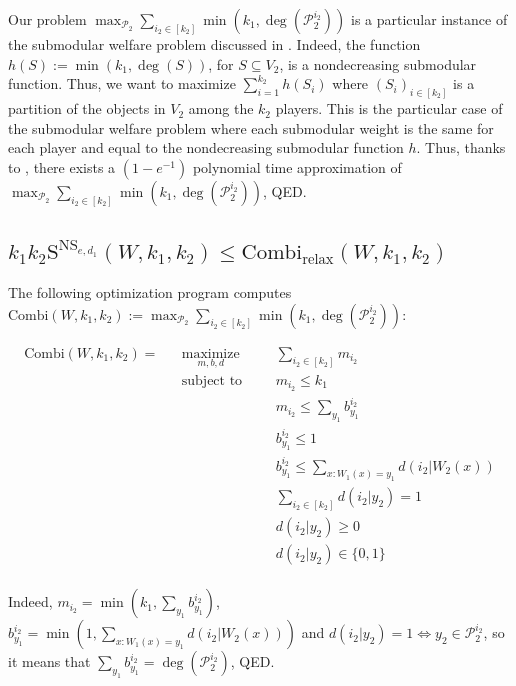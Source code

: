 \documentclass[11pt]{article}
\theoremstyle{definition}
\theoremstyle{remark}
\DeclareMathOperator{\maxi}{\text{maximize}}
\DeclareMathOperator{\st}{\text{subject to}}
\begin{document}
Our problem $\max_{\mathcal{P}_2}\sum_{i_2 \in [k_2]}\min\left(k_1,\deg(\mathcal{P}_2^{i_2})\right)$ is a particular instance of the submodular welfare problem discussed in \cite{Vondrak08}. Indeed, the function $h(S) := \min\left(k_1,\deg(S)\right)$, for $S \subseteq V_2$, is a nondecreasing submodular function. Thus, we want to maximize $\sum_{i=1}^{k_2}h(S_i)$ where $(S_i)_{i \in [k_2]}$ is a partition of the objects in $V_2$ among the $k_2$ players. This is the particular case of the submodular welfare problem where each submodular weight is the same for each player and equal to the nondecreasing submodular function $h$. Thus, thanks to \cite{Vondrak08}, there exists a $(1-e^{-1})$ polynomial time approximation of $\max_{\mathcal{P}_2}\sum_{i_2 \in [k_2]}\min\left(k_1,\deg(\mathcal{P}_2^{i_2})\right)$, QED.

\subsection{$k_1k_2\mathrm{S}^{\mathrm{NS}_{e,d_1}}(W,k_1,k_2) \leq \textrm{Combi}_{\text{relax}}(W,k_1,k_2)$}
The following optimization program computes $\textrm{Combi}(W,k_1,k_2) := \max_{\mathcal{P}_2}\sum_{i_2 \in [k_2]}\min\left(k_1,\deg(\mathcal{P}_2^{i_2})\right)$:

\begin{equation}
  \begin{aligned}
    \textrm{Combi}(W,k_1,k_2) = &&\underset{m,b,d}{\maxi} &&& \sum_{i_2 \in [k_2]} m_{i_2}\\
    &&\st &&& m_{i_2} \leq k_1 \\
    &&&&& m_{i_2} \leq \sum_{y_1}b^{i_2}_{y_1} \\
    &&&&& b^{i_2}_{y_1} \leq 1 \\
    &&&&& b^{i_2}_{y_1} \leq \sum_{x:W_1(x)=y_1} d(i_2|W_2(x))\\
    &&&&& \sum_{i_2 \in [k_2]} d(i_2|y_2) = 1\\
    &&&&& d(i_2|y_2) \geq 0\\
    &&&&& d(i_2|y_2) \in \{0,1\}\\
  \end{aligned}
\end{equation}

Indeed, $m_{i_2} = \min(k_1 , \sum_{y_1}b^{i_2}_{y_1})$, $b^{i_2}_{y_1} = \min(1,\sum_{x:W_1(x)=y_1} d(i_2|W_2(x)))$ and $d(i_2|y_2)=1 \iff y_2 \in \mathcal{P}_2^{i_2}$, so it means that $\sum_{y_1}b^{i_2}_{y_1} = \deg(\mathcal{P}_2^{i_2})$, QED.
\end{document}

